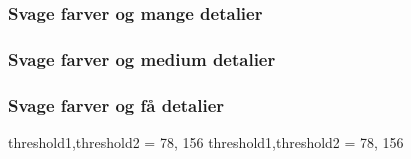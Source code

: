 \subsubsection{Svage farver og mange detalier}
\subsubsection{Svage farver og medium detalier}
\subsubsection{Svage farver og få detalier}










threshold1,threshold2 = 78, 156
threshold1,threshold2 = 78, 156







